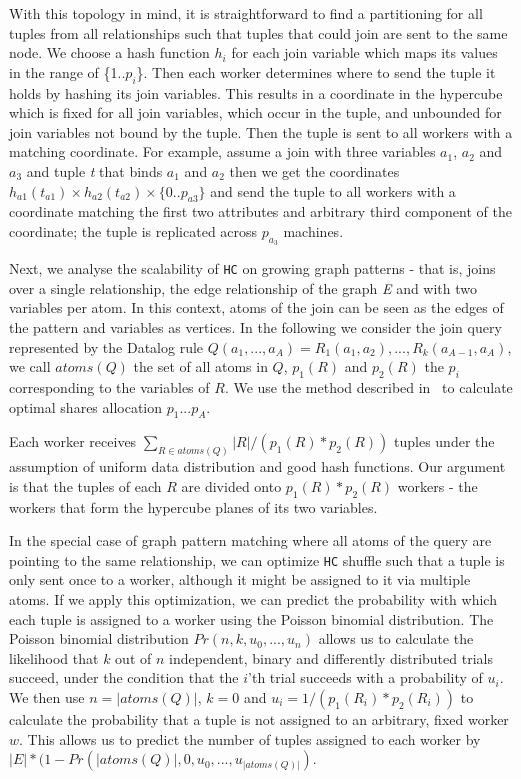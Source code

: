 With this topology in mind, it is straightforward to find a partitioning for all tuples from all relationships such that tuples that could join are sent to the same node.
We choose a hash function $h_i$ for each join variable which maps its values in the range of \{1..$p_i$\}.
Then each worker determines where to send the tuple it holds by hashing its join variables.
This results in a coordinate in the hypercube which is fixed for all join variables, which occur in the tuple, and unbounded for join variables not bound by the tuple.
Then the tuple is sent to all workers with a matching coordinate.
For example, assume a join with three variables $a_1$, $a_2$ and $a_3$ and tuple \textit{t} that binds $a_1$ and $a_2$ then we get the coordinates $h_{a1}(t_{a1}) \times h_{a2}(t_{a2}) \times \{0..p_{a3}\}$ and send the tuple
to all workers with a coordinate matching the first two attributes and arbitrary third component of the coordinate; the tuple is replicated across $p_{a_3}$ machines.

Next, we analyse the scalability of \texttt{HC} on growing graph patterns - that is, joins over a single relationship, the edge relationship of the graph \textit{E} and with two variables per atom.
In this context, atoms of the join can be seen as the edges of the pattern and variables as vertices.
In the following we consider the join query represented by the Datalog rule $Q(a_1, ..., a_A) = R_1(a_1, a_2), ..., R_k(a_{A-1}, a_A)$, we call $atoms(Q)$ the set of all atoms in $Q$, $p_1(R)$ and $p_2(R)$ the $p_i$ corresponding to the variables of $R$.
We use the method described in~\cite{myria-detailed} to calculate optimal shares allocation $p_1 ... p_A$.

Each worker receives $\sum_{R \in atoms(Q)} |R| / (p_1(R) * p_2(R))$ tuples under the assumption of uniform data distribution and good hash functions.
Our argument is that the tuples of each $R$ are divided onto $p_1(R) * p_2(R)$ workers - the workers that form the hypercube planes of its two variables.

In the special case of graph pattern matching where all atoms of the query are pointing to the same relationship, we can optimize \texttt{HC} shuffle such that a tuple is only sent once to a worker, although it might be assigned to it via multiple atoms.
If we apply this optimization, we can predict the probability with which each tuple is assigned to a worker using the Poisson binomial distribution.
The Poisson binomial distribution $Pr(n, k, u_0, ..., u_n)$ allows us to calculate the likelihood that $k$ out of $n$ independent, binary and differently distributed trials succeed, under the condition that the $i$'th trial succeeds with a probability of $u_i$.
We then use $n = |atoms(Q)|$, $k = 0$ and $u_i=1/(p_1(R_i) * p_2(R_i))$ to calculate the probability that a tuple is not assigned to an arbitrary, fixed worker $w$.
This allows us to predict the number of tuples assigned to each worker by $|E| * (1 - Pr(|atoms(Q)|, 0, u_0, ..., u_{|atoms(Q)|})$.

